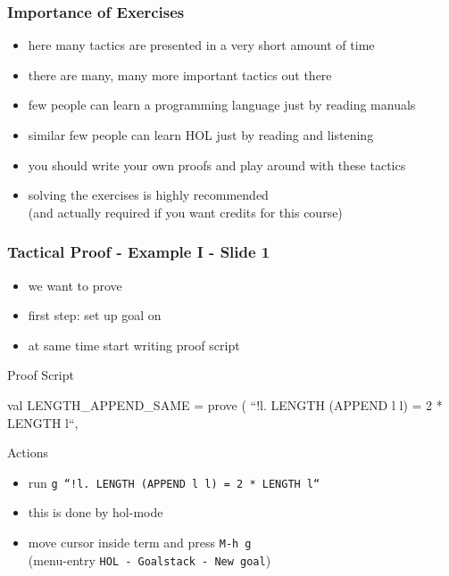 \begin{frame}
\frametitle{Importance of Exercises}

\begin{itemize}
\item here many tactics are presented in a very short amount of time
\item there are many, many more important tactics out there
\item few people can learn a programming language just by reading manuals
\item similar few people can learn HOL just by reading and listening
\item you should write your own proofs and play around with these tactics
\item solving the exercises is highly recommended\\(and actually required if you want credits for this course)
\end{itemize}
\end{frame}

\begin{frame}[fragile]
\frametitle{Tactical Proof - Example I - Slide 1}

\begin{itemize}
\item we want to prove 
\item first step: set up goal on 
\item at same time start writing proof script
\end{itemize}

\begin{block}{Proof Script}
\begin{semiverbatim}\small
val LENGTH_APPEND_SAME = prove (
  ``!l. LENGTH (APPEND l l) = 2 * LENGTH l``,
\end{semiverbatim}
\end{block}

\begin{block}{Actions}
\begin{itemize}
\item run \texttt{g ``!l.\ LENGTH (APPEND l l) = 2 * LENGTH l``}
\item this is done by hol-mode
\item move cursor inside term and press \texttt{M-h g}\\
      (menu-entry \texttt{HOL - Goalstack - New goal})
\end{itemize}
\end{block}
\end{frame}



